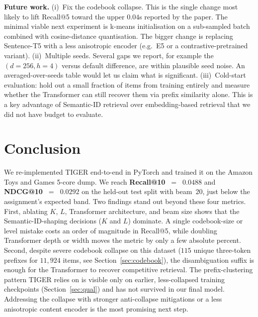 \documentclass[sigconf]{acmart}
\begin{document}
\textbf{Future work.}
(i)~Fix the codebook collapse.  This is the single change most likely
to lift Recall@5 toward the upper $0.04$s reported by the paper.
The minimal viable next experiment is k-means initialisation on a
sub-sampled batch combined with cosine-distance quantisation. The
bigger change is replacing Sentence-T5 with a less anisotropic
encoder (e.g.\ E5 or a contrastive-pretrained variant).
(ii)~Multiple seeds.  Several gaps we report, for example the
$(d{=}256, h{=}4)$ versus default difference, are within plausible seed
noise. An averaged-over-seeds table would let us claim what is
significant.
(iii)~Cold-start evaluation: hold out a small fraction of items from
training entirely and measure whether the Transformer can still
recover them via prefix similarity alone.  This is a key
advantage of Semantic-ID retrieval over embedding-based retrieval that
we did not have budget to evaluate.

\pagebreak[3]
\section{Conclusion}
\begin{sloppypar}
We re-implemented TIGER end-to-end in PyTorch and trained it on the
Amazon Toys and Games 5-core dump.  We reach \textbf{Recall@10~$=$~$0.0488$}
and \textbf{NDCG@10~$=$~$0.0292$} on the held-out test split with
beam~$20$, just below the assignment's expected band.  Two findings
stand out beyond these four metrics.  First, ablating $K$, $L$,
Transformer architecture, and beam size shows that the
Semantic-ID-shaping decisions ($K$ and $L$) dominate. A single
codebook-size or level mistake costs an order of magnitude in
Recall@5, while doubling Transformer depth or width moves the metric
by only a few absolute percent.  Second, despite severe codebook
collapse on this dataset ($115$ unique three-token prefixes for
$11{,}924$ items, see Section~\ref{sec:codebook}), the disambiguation
suffix is enough for the Transformer to recover competitive
retrieval. The prefix-clustering pattern TIGER relies on is visible
only on earlier, less-collapsed training checkpoints
(Section~\ref{sec:qual}) and has not survived in our final model.
Addressing the collapse with stronger anti-collapse mitigations or a
less anisotropic content encoder is the most promising next step.
\end{sloppypar}
\end{document}
